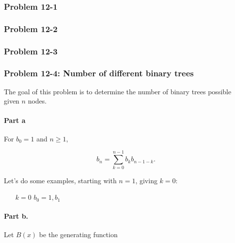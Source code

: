 \documentclass{article}
\begin{document}
\begin{comment}
Substituting and expanding:

\begin{equation}
  2^x = 1 + x\ln 2 + \frac{x^2 \ln^2 2}{2!} + \frac{x^3 \ln^3 2}{3!} + \cdots.
\end{equation}

For $x > 0, 2^x$ is clearly positive. For $x = 0, 2^0 = 1$, again positive. When $x < 0$,

\begin{equation}
  2^{-x} = 1 - x\ln 2 + \frac{x^2 \ln^2 2}{2!} - \frac{x^3 \ln^3 2}{3!} + \frac{x^4 \ln^4 2}{4!}
  - \frac{x^5 \ln^5 2}{5!} + \cdots.
\end{equation}
\end{comment}


\subsubsection{Problem 12-1}

\subsubsection{Problem 12-2}

\subsubsection{Problem 12-3}

\subsubsection{Problem 12-4: Number of different binary trees}

The goal of this problem is to determine the number of binary
trees possible given $n$ nodes.

\paragraph{Part a} For $b_0 = 1$ and $n \geq 1$,

\[
b_n = \sum_{k=0}^{n-1} b_kb_{n-1-k}.
\]

Let's do some examples, starting with $n = 1$, giving $k = 0$:

\begin{itemize}
\item [$k=0$] $b_0 = 1, b_1$
\end{itemize}

\paragraph{Part b.} Let $B(x)$ be the generating function
\end{document}
